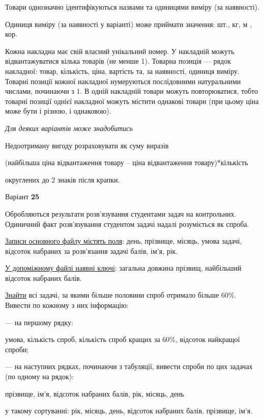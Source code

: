 \documentclass[11pt, ukrainian]{article}
\begin{document}
Товари однозначно ідентифікуються назвами та одиницями виміру (за наявності).

Одиниця виміру (за наявності у варіанті) може приймати значення: шт., кг, м , кор.

Кожна накладна має свій власний унікальний номер.
У накладній можуть відвантажуватися кілька товарів (не менше 1).
Товарна позиція --- рядок накладної: товар, кількість, ціна, вартість та, за наявності, одиниця виміру.
Товарні позиції кожної накладної нумеруються послідовними натуральними числами, починаючи з 1.
В одній накладній товари можуть повторюватися, 
тобто товарні позиції однієї накладної можуть містити однакові товари 
(при цьому ціна може бути і різною, і однаковою).

\bigskip\textit{Для деяких варіантів може знадобитись}

Недоотриману вигоду розраховувати як суму виразів
{\center (найбільша ціна відвантаження товару – ціна відвантаження товару)*кількість\par}

\bigskip
{\noindent} округлених до 2 знаків після крапки.




\par
\newpage
{\center Варіант  \No \textbf { 25 }\par}
\bigskip
Обробляються результати розв’язування студентами задач на контрольних.
Одиничний факт роз\-в’я\-зу\-вання студентом задачі надалі розуміється як спроба.

\underline{Записи основного файлу містять поля}: день, прізвище, місяць, умова задачі, відсоток набраних за розв’язання задачі балів, ім’я, рік.

\underline{У допоміжному файлі наявні ключі}: загальна довжина прізвищ, найбільший відсоток набраних балів.

\underline{Знайти} всі задачі, за якими більше половини спроб отримало більше 60\%. Вивести по кожному з них інформацію:\par
{\noindent}--- на першому рядку:\par
умова, кількість спроб, кількість спроб кращих за 60\%, відсоток найкращої спроби;

{\noindent}--- на наступних рядках, починаючи з табуляції, вивести спроби по цих задачах (по одному на рядок):\par
прізвище, ім’я, відсоток набраних балів, рік, місяць, день

{\noindent}у такому сортуванні: рік, місяць, день, відсоток набраних балів, прізвище, ім’я.
\end{document}
